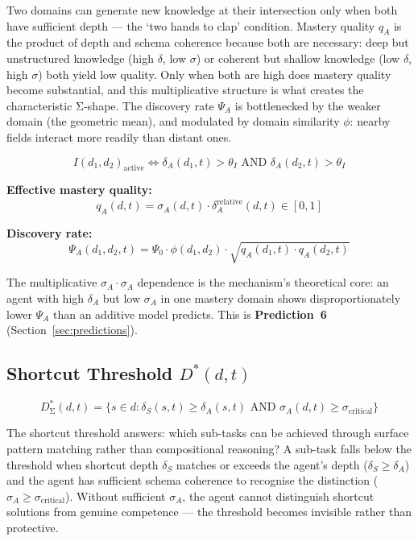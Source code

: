 \documentclass[11pt,a4paper]{article}
\begin{document}
Two domains can generate new knowledge at their intersection only when both have sufficient depth --- the `two hands to clap' condition. Mastery quality $q_A$ is the product of depth and schema coherence because both are necessary: deep but unstructured knowledge (high $\delta$, low $\sigma$) or coherent but shallow knowledge (low $\delta$, high $\sigma$) both yield low quality. Only when both are high does mastery quality become substantial, and this multiplicative structure is what creates the characteristic Σ-shape. The discovery rate $\Psi_A$ is bottlenecked by the weaker domain (the geometric mean), and modulated by domain similarity $\phi$: nearby fields interact more readily than distant ones.

\begin{equation}\label{eq:activation-condition}
I(d_1,d_2)_{\text{active}} \iff \delta_A(d_1,t) > \theta_I \text{ AND } \delta_A(d_2,t) > \theta_I
\end{equation}

\textbf{Effective mastery quality:}
\begin{equation}\label{eq:mastery-quality}
q_A(d,t) = \sigma_A(d,t) \cdot \delta_A^{\text{relative}}(d,t) \in [0,1]
\end{equation}

\textbf{Discovery rate:}
\begin{equation}\label{eq:discovery-rate}
\Psi_A(d_1,d_2,t) = \Psi_0 \cdot \phi(d_1,d_2) \cdot \sqrt{q_A(d_1,t) \cdot q_A(d_2,t)}
\end{equation}

The multiplicative $\sigma_A \cdot \sigma_A$ dependence is the
mechanism's theoretical core: an agent with high $\delta_A$ but low
$\sigma_A$ in one mastery domain shows disproportionately lower $\Psi_A$
than an additive model predicts. This is \textbf{Prediction~6}
(Section~\ref{sec:predictions}).

\subsection{Shortcut Threshold \texorpdfstring{$D^*(d,t)$}{D*(d,t)}}\label{sec:shortcut-threshold}

\begin{equation}\label{eq:shortcut-threshold}
D^*_{\text{Σ}}(d,t) = \{s \in d : \delta_S(s,t) \geq \delta_A(s,t) \text{ AND } \sigma_A(d,t) \geq \sigma_{\text{critical}}\}
\end{equation}

The shortcut threshold answers: which sub-tasks can be achieved through surface pattern matching rather than compositional reasoning? A sub-task falls below the threshold when shortcut depth $\delta_S$ matches or exceeds the agent's depth ($\delta_S \geq \delta_A$) and the agent has sufficient schema coherence to recognise the distinction ($\sigma_A \geq \sigma_{\text{critical}}$). Without sufficient $\sigma_A$, the agent cannot distinguish shortcut solutions from genuine competence --- the threshold becomes invisible rather than protective.
\end{document}
